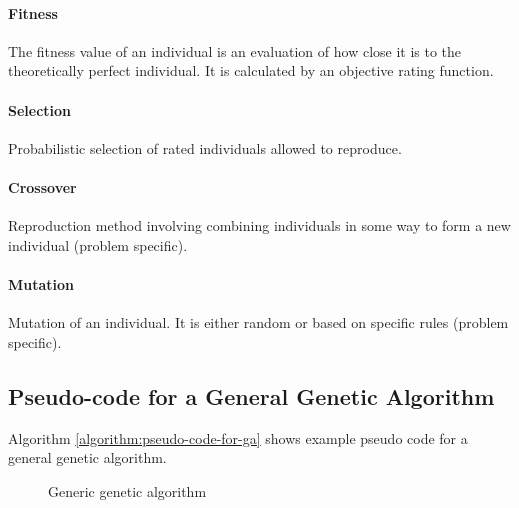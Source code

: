 \paragraph{Fitness}
The fitness value of an individual is an evaluation of how close it is to the theoretically perfect individual. It is calculated by an objective rating function.

\paragraph{Selection}
Probabilistic selection of rated individuals allowed to reproduce.

\paragraph{Crossover}
Reproduction method involving combining individuals in some way to form a new individual (problem specific). 

\paragraph{Mutation}
Mutation of an individual. It is either random or based on specific rules (problem specific). 

\subsection{Pseudo-code for a General Genetic Algorithm}

Algorithm \vref{algorithm:pseudo-code-for-ga} shows example pseudo code for a general genetic algorithm.

\begin{figure}[H]
\begin{algorithm}[H]
\SetAlgoLined
\DontPrintSemicolon
{}
\caption{Generic genetic algorithm}
\label{algorithm:pseudo-code-for-ga}
\end{algorithm}
\end{figure}

